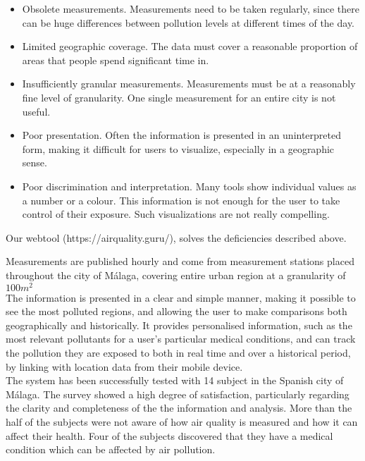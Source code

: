 \begin{itemize}

\item Obsolete measurements. Measurements need to be taken regularly, since there can be huge differences
between pollution levels at different times of the day.

\item Limited geographic coverage. The data must cover a reasonable proportion of areas that people spend significant time in.

\item Insufficiently granular measurements. Measurements must be at a reasonably fine level of granularity. One single measurement for an entire city is not useful.

\item Poor presentation. Often the information is presented in an uninterpreted form, making it difficult for users to visualize, especially in a geographic sense.

\item Poor discrimination and interpretation. Many tools show individual values as a number or a colour. This information is not
enough for the user to take control of their exposure. Such visualizations are not really compelling. 

\end{itemize}

Our webtool (https://airquality.guru/), solves the deficiencies described above.

Measurements are published hourly and come from measurement stations placed throughout the 
city of Málaga, covering entire urban region at a granularity of $100m^2$\\

The information is presented in a clear and simple manner, making it possible to see the most polluted regions,
and allowing the user to make comparisons both geographically and historically. It provides personalised information, such as the most relevant 
pollutants for a user's particular medical conditions, and can track
the pollution they are exposed to both in real time and over a historical period, by linking with location data from their mobile device. \\

The system has been successfully tested with 14 subject in the Spanish city of Málaga. The survey showed a high degree of satisfaction, 
particularly regarding the clarity and completeness of the the information and analysis.
More than the half of the subjects were not aware of how air quality is measured and how it 
can affect their health. Four of the subjects discovered that they have a medical 
condition which can be affected by air pollution.
    
